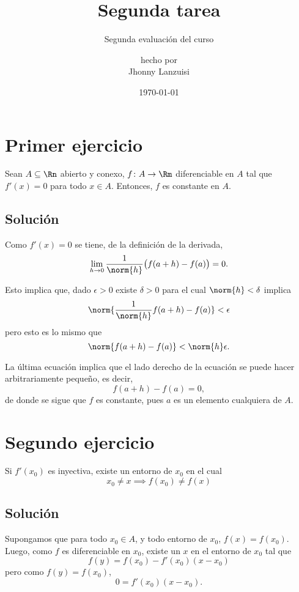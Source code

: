\documentclass{scrartcl}
\begin{document}
%
\title{Segunda tarea}
\subtitle{Segunda evaluación del curso}
\subject{Análisis III}
\titlehead{Universidad Simón Bolívar\hfill Caracas, Venezuela}
\author{{\normalsize hecho por} \\ Jhonny Lanzuisi}
\date{\today}
\maketitle

\section{Primer ejercicio}

Sean \(A\subseteq\Rn\) abierto y conexo,
\(f\colon A\to\Rm\) diferenciable en \(A\)
tal que \(f'(x)=0\) para todo \(x\in A\).
Entonces, \(f\) es constante en \(A\).

\subsection{Solución}

Como \(f'(x) = 0\) se tiene,
de la definición de la derivada,
\[
\lim_{h\to0}
\frac{1}{\norm{h}}
\big(f(a+h)-f(a)\big) = 0.
\]

Esto implica que, dado \(\epsilon>0\)
existe \(\delta>0\) para el cual
\(\norm{h}<\delta\) implica
\[
\norm{\frac{1}{\norm{h}} f(a+h)-f(a)} < \epsilon
\]
pero esto es lo mismo que
\[
\norm{f(a+h)-f(a)} < \norm{h}\epsilon.
\]

La última ecuación implica que
el lado derecho de la ecuación se puede
hacer arbitrariamente pequeño,
es decir,
\[
f(a+h) - f(a) = 0,
\]
de donde se sigue que \(f\)
es constante, pues \(a\) es
un elemento cualquiera de \(A\).

\section{Segundo ejercicio}

Si \(f'(x_0)\) es inyectiva, existe un
entorno de \(x_0\) en el cual
\[x_0\neq x\implies f(x_0)\neq f(x)\]

\subsection{Solución}

Supongamos que para todo \(x_0\in A\),
y todo entorno de \(x_0\), \(f(x) = f(x_0)\).
Luego, como \(f\) es diferenciable en \(x_0\),
existe un \(x\) en el entorno de \(x_0\) tal que
\[
f(y) = f(x_0) - f'(x_0)(x-x_0)
\]
pero como \(f(y)=f(x_0)\),
\[
0 = f'(x_0)(x-x_0).
\]
\end{document}
